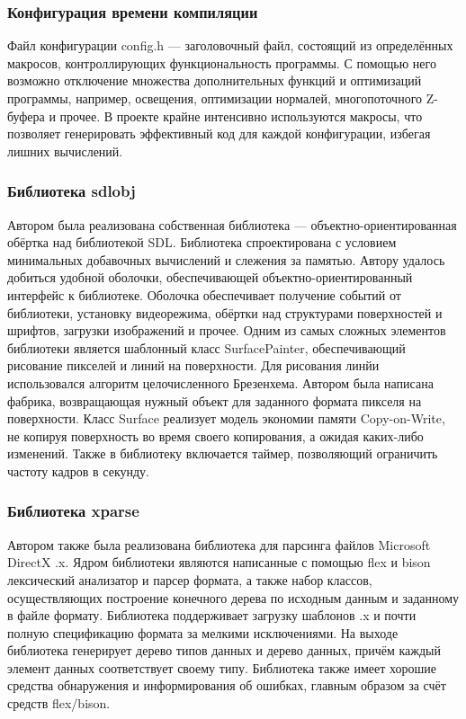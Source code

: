 \documentclass[a4paper,12pt]{report}
\numberwithin{equation}{section}
\begin{document}
\subsubsection{Конфигурация времени компиляции}
Файл конфигурации config.h --- заголовочный файл, состоящий из определённых макросов, контроллирующих функциональность программы. С помощью него возможно отключение множества дополнительных функций и оптимизаций программы, например, освещения, оптимизации нормалей, многопоточного Z-буфера и прочее. В проекте крайне интенсивно используются макросы, что позволяет генерировать эффективный код для каждой конфигурации, избегая лишних вычислений.

\subsubsection{Библиотека sdlobj}
Автором была реализована собственная библиотека --- объектно-ориентированная обёртка над библиотекой SDL. Библиотека спроектирована с условием минимальных добавочных вычислений и слежения за памятью. Автору удалось добиться удобной оболочки, обеспечивающей объектно-ориентированный интерфейс к библиотеке. Оболочка обеспечивает получение событий от библиотеки, установку видеорежима, обёртки над структурами поверхностей и шрифтов, загрузки изображений и прочее. Одним из самых сложных элементов библиотеки является шаблонный класс SurfacePainter, обеспечивающий рисование пикселей и линий на поверхности. Для рисования линйи использовался алгоритм целочисленного Брезенхема. Автором была написана фабрика, возвращающая нужный объект для заданного формата пикселя на поверхности. Класс Surface реализует модель экономии памяти Copy-on-Write, не копируя поверхность во время своего копирования, а ожидая каких-либо изменений. Также в библиотеку включается таймер, позволяющий ограничить частоту кадров в секунду.

\subsubsection{Библиотека xparse}
Автором также была реализована библиотека для парсинга файлов Microsoft DirectX .x. Ядром библиотеки являются написанные с помощью flex и bison лексический анализатор и парсер формата, а также набор классов, осуществляющих построение конечного дерева по исходным данным и заданному в файле формату. Библиотека поддерживает загрузку шаблонов .x и почти полную спецификацию формата за мелкими исключениями. На выходе библиотека генерирует дерево типов данных и дерево данных, причём каждый элемент данных соответствует своему типу. Библиотека также имеет хорошие средства обнаружения и информирования об ошибках, главным образом за счёт средств flex/bison.
\end{document}
